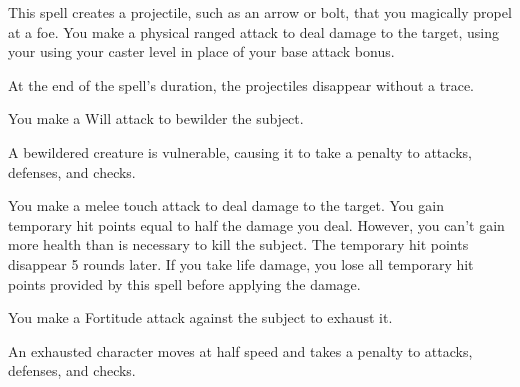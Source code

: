 \begin{spelleffect}
    This spell creates a projectile, such as an arrow or bolt, that you magically propel at a foe. You make a physical ranged attack to deal damage to the target, using your using your caster level in place of your base attack bonus.
\end{spelleffect}
\begin{spellnotes}
    At the end of the spell's duration, the projectiles disappear without a trace.
\end{spellnotes}

\spelldur{\durshort}
\begin{spellhealthy}
    You make a Will attack to bewilder the subject.
\end{spellhealthy}
\begin{spellnotes}
    A bewildered creature is vulnerable, causing it to take a  penalty to attacks, defenses, and checks.
\end{spellnotes}

\begin{spelleffect}
    You make a melee touch attack to deal damage to the target. You gain temporary hit points equal to half the damage you deal. However, you can't gain more health than is necessary to kill the subject. The temporary hit points disappear 5 rounds later. If you take life damage, you lose all temporary hit points provided by this spell before applying the damage.
\end{spelleffect}

\begin{spelleffect}
    You make a Fortitude attack against the subject to exhaust it.
\end{spelleffect}
\begin{spellnotes}
    An exhausted character moves at half speed and takes a  penalty to attacks, defenses, and checks.
\end{spellnotes}

